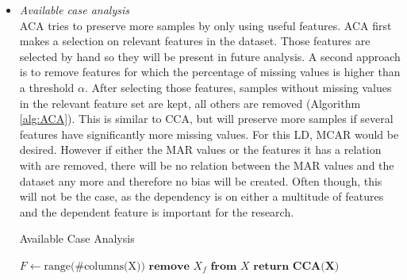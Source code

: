 \documentclass[10pt,a4paper]{report}
\begin{document}
\begin{itemize}
		\item \textit{Available case analysis} \\
		ACA tries to preserve more samples by only using useful features. ACA first makes a selection on relevant features in the dataset. Those features are selected by hand so they will be present in future analysis. A second approach is to remove features for which the percentage of missing values is higher than a threshold $\alpha$. After selecting those features, samples without missing values in the relevant feature set are kept, all others are removed (Algorithm \ref{alg:ACA}). This is similar to CCA, but will preserve more samples if several features have significantly more missing values. For this LD, MCAR would be desired. However if either the MAR values or the features it has a relation with are removed, there will be no relation between the MAR values and the dataset any more and therefore no bias will be created\cite{haukoos2007advanced, donders2006gentle, patrician2002multiple, myrtveit2001analyzing}. Often though, this will not be the case, as the dependency is on either a multitude of features and the dependent feature is important for the research.
		
		\begin{algorithm}[H]
			\caption{Available Case Analysis}\label{alg:ACA}
			\begin{algorithmic}[1]
				\State $F \gets \text{range(\#columns(X))}$ 	
				 					
				 				 			
				\State $\textbf{remove } X_f \textbf{ from } X$ 				
				\EndIf
				\EndFor
				\State $\textbf{return CCA(X)}$
				\EndProcedure
			\end{algorithmic}
		\end{algorithm}	
		

\end{itemize}
\end{document}
